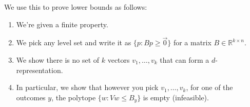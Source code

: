 \documentclass[12pt]{article}
\theoremstyle{definition}
\newcommand{\reals}{\mathbb{R}}
\begin{document}
We use this to prove lower bounds as follows:
\begin{enumerate}
  \item We're given a finite property.
  \item We pick any level set and write it as $\{ p : Bp \geq \vec{0}\}$ for a matrix $B \in \reals^{k \times n}$.
  \item We show there is no set of $k$ vectors $v_1,\dots,v_k$ that can form a $d$-representation.
  \item In particular, we show that however you pick $v_1,\dots,v_k$, for one of the outcomes $y$, the polytope $\{w : Vw \leq B_y \}$ is empty (infeasible).
\end{enumerate}
\end{document}
